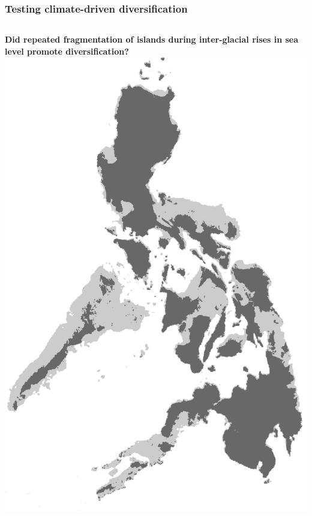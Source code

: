\begin{frame}
    \frametitle{Testing climate-driven diversification}
    \begin{columns}[c]
    \textbf{Did repeated fragmentation of islands during inter-glacial rises in sea level
    promote diversification?}\\
            \includegraphics[width=\textwidth]{../images/maps/Philippines.png}
    \end{columns}
\end{frame}

